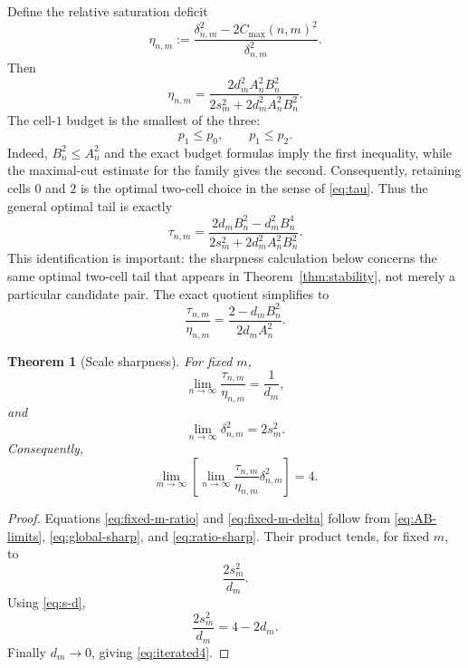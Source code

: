 \documentclass[11pt]{article}
\newtheorem{theorem}{Theorem}[section]
\newcommand{\cmax}{C_{\max}}
\newcommand{\dd}{\delta}
\newcommand{\etaq}{\eta}
\newcommand{\tauq}{\tau}
\begin{document}
Define the relative saturation deficit
\[
  \etaq_{n,m}
  :=
  \frac{\dd_{n,m}^2-2\cmax(n,m)^2}{\dd_{n,m}^2}.
\]
Then
\begin{equation}\label{eq:eta-sharp}
  \boxed{
  \etaq_{n,m}
  =
  \frac{
    2d_m^2A_n^2B_n^2
  }{
    2s_m^2+2d_m^2A_n^2B_n^2
  }.
  }
\end{equation}
The cell-$1$ budget is the smallest of the three:
\begin{equation}\label{eq:cell1-min}
  p_1\le p_0,
  \qquad
  p_1\le p_2.
\end{equation}
Indeed, $B_n^2\le A_n^2$ and the exact budget formulas imply the first
inequality, while the maximal-cut estimate for the family gives the second.
Consequently, retaining cells $0$ and $2$ is the optimal two-cell choice in
the sense of \eqref{eq:tau}.  Thus the general optimal tail is exactly
\begin{equation}\label{eq:tau-sharp}
  \boxed{
  \tauq_{n,m}
  =
  \frac{
    2d_mB_n^2-d_m^2B_n^4
  }{
    2s_m^2+2d_m^2A_n^2B_n^2
  }.
  }
\end{equation}
This identification is important: the sharpness calculation below concerns
the same optimal two-cell tail that appears in
Theorem~\ref{thm:stability}, not merely a particular candidate pair.
The exact quotient simplifies to
\begin{equation}\label{eq:ratio-sharp}
  \boxed{
  \frac{\tauq_{n,m}}{\etaq_{n,m}}
  =
  \frac{2-d_mB_n^2}{2d_mA_n^2}.
  }
\end{equation}

\begin{theorem}[Scale sharpness]\label{thm:scale-sharp}
For fixed $m$,
\begin{equation}\label{eq:fixed-m-ratio}
  \lim_{n\to\infty}
  \frac{\tauq_{n,m}}{\etaq_{n,m}}
  =
  \frac1{d_m},
\end{equation}
and
\begin{equation}\label{eq:fixed-m-delta}
  \lim_{n\to\infty}\dd_{n,m}^2=2s_m^2.
\end{equation}
Consequently,
\begin{equation}\label{eq:iterated4}
  \boxed{
  \lim_{m\to\infty}
  \left[
    \lim_{n\to\infty}
    \frac{\tauq_{n,m}}{\etaq_{n,m}}
    \dd_{n,m}^2
  \right]
  =4.
  }
\end{equation}
\end{theorem}

\begin{proof}
Equations \eqref{eq:fixed-m-ratio} and \eqref{eq:fixed-m-delta} follow from
\eqref{eq:AB-limits}, \eqref{eq:global-sharp}, and
\eqref{eq:ratio-sharp}.  Their product tends, for fixed $m$, to
\[
  \frac{2s_m^2}{d_m}.
\]
Using \eqref{eq:s-d},
\[
  \frac{2s_m^2}{d_m}
  =
  4-2d_m.
\]
Finally $d_m\to0$, giving \eqref{eq:iterated4}.
\end{proof}
\end{document}
